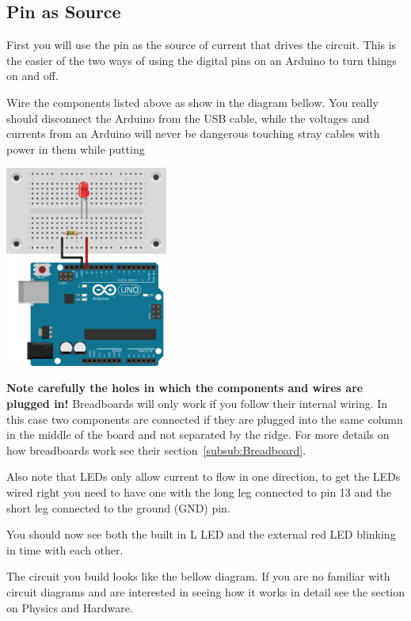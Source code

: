 \subsection{Pin as Source}
First you will use the pin as the source of current that drives the circuit.
This is the easier of the two ways of using the digital pins on an Arduino
to turn things on and off. 

Wire the components listed above as show in the diagram bellow.
You really should disconnect the Arduino from the USB cable,
while the voltages and currents from an Arduino will never be dangerous
touching stray cables with power in them while putting 
\begin{center}
    \includegraphics[width=0.4\textwidth]{./Graphics/PinSource}
\end{center}


\textbf{Note carefully the holes in which the components and wires are plugged in!}
Breadboards will only work if you follow their internal wiring.
In this case two components are connected if they are plugged into the same column
in the middle of the board 
and not separated by the ridge.
For more details on how breadboards work see their section~\ref{subsub:Breadboard}.  

Also note that LEDs only allow current to flow in one direction,
to get the LEDs wired right you need to have one with 
the long leg connected to pin 13
and the short leg connected to the ground (GND) pin.

You should now see both the built in L LED 
and the external red LED blinking in time with each other.

The circuit you build looks like the bellow diagram.
If you are no familiar with circuit diagrams 
and are interested in seeing how it works in detail
see the section on Physics and Hardware.

